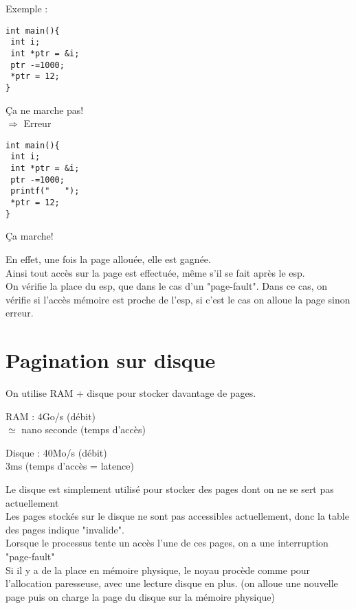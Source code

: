\documentclass[12pt,a4paper]{report}
\begin{document}
Exemple : \\
\begin{minipage}{0.5\linewidth}
\begin{verbatim}
int main(){
 int i;
 int *ptr = &i;
 ptr -=1000;
 *ptr = 12;
}
\end{verbatim}
Ça ne marche pas!\\
$\Rightarrow$ Erreur
\end{minipage}
\begin{minipage}{0.5\linewidth}
\begin{verbatim}
int main(){
 int i;
 int *ptr = &i;
 ptr -=1000;
 printf("   ");
 *ptr = 12;
}
\end{verbatim}
Ça marche!
\end{minipage}

\bigskip
En effet, une fois la page allouée, elle est gagnée.\\
Ainsi tout accès sur la page est effectuée, même s'il se fait après le esp.\\ On vérifie la place du esp, que dans le cas d'un "page-fault". Dans ce cas, on vérifie si l’accès mémoire est proche de l'esp, si c'est le cas on alloue la page sinon erreur.\\

\chapter{Pagination sur disque} 
On utilise RAM + disque pour stocker davantage de pages.\\

\begin{minipage}{0.5\linewidth}
RAM : 4Go/s (débit) \\
\hspace{2cm}$\simeq$ nano seconde (temps d'accès)\\
\end{minipage}
\begin{minipage}{0.5\linewidth}
Disque : 40Mo/s (débit) \\
\hspace{2cm} 3ms (temps d'accès = latence)\\
\end{minipage}

Le disque est simplement utilisé pour stocker des pages dont on ne se sert pas actuellement\\
Les pages stockés sur le disque ne sont pas accessibles actuellement, donc la table des pages indique "invalide".\\
Lorsque le processus tente un accès l'une de ces pages, on a une interruption  "page-fault" \\
Si il y a de la place en mémoire physique, le noyau procède comme pour l'allocation paresseuse, avec une lecture disque en plus. (on alloue une nouvelle page puis on charge la page du disque sur la mémoire physique)\\
\end{document}
